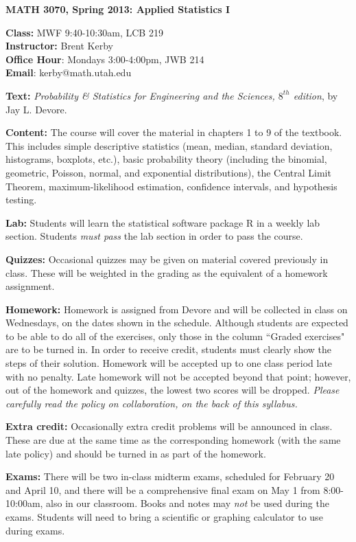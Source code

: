 \documentclass[12pt]{article}
\begin{document}
\begin{center}
{\bf MATH 3070, Spring 2013: Applied Statistics I}
\end{center}

\vspace{-.5cm}
{\bf Class:} MWF 9:40-10:30am, LCB 219\\
{\bf Instructor:}  Brent Kerby\\
{\bf Office Hour}: Mondays 3:00-4:00pm, JWB 214\\
{\bf Email}: kerby@math.utah.edu

{\bf Text:}  {\sl Probability \& Statistics for Engineering and the Sciences, $8^{th}$ edition}, by Jay L. 
Devore.

{\bf Content:} The course will cover the material in chapters 1 to 9 of the textbook. This includes simple descriptive statistics (mean, median, standard deviation, histograms, boxplots, etc.), basic probability theory (including the binomial, geometric, Poisson, normal, and exponential distributions), the Central Limit Theorem, maximum-likelihood estimation, confidence intervals, and hypothesis testing.

{\bf Lab:} Students will learn the statistical software package R in a weekly lab section. Students \emph{must pass} the lab section in order to pass the course.

{\bf Quizzes:} Occasional quizzes may be given on material covered previously in class. These will be weighted in the grading as the equivalent of a homework assignment.

{\bf Homework:} Homework is assigned from Devore and will be collected in class on Wednesdays, on the dates shown in the schedule. Although students are expected to be able to do all of the exercises, only those in the column ``Graded exercises" are to be turned in. In order to receive credit, students must clearly show the steps of their solution. Homework will be accepted up to one class period late with no penalty. Late homework will not be accepted beyond that point; however, out of the homework and quizzes, the lowest two scores will be dropped. \emph{Please carefully read the policy on collaboration, on the back of this syllabus.}

{\bf Extra credit:} Occasionally extra credit problems will be announced in class. These are due at the same time as the corresponding homework (with the same late policy) and should be turned in as part of the homework.

{\bf Exams:}  There will be two in-class midterm exams, scheduled for February 20 and April 10, and there will be a comprehensive final exam on May 1 from 8:00-10:00am, also in our classroom. Books and notes may \emph{not} be used during the exams. Students will need to bring a scientific or graphing calculator to use during exams.
\end{document}
